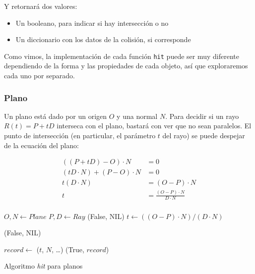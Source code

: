 Y retornará dos valores:

\begin{itemize}
    \item Un booleano, para indicar si hay intersección o no
    \item Un diccionario con los datos de la colisión, si corresponde
\end{itemize}

Como vimos, la implementación de cada función \texttt{hit} puede ser muy
diferente dependiendo de la forma y las propiedades de cada objeto, así que
exploraremos cada uno por separado.

\subsubsection{Plano}

Un plano está dado por un origen $O$ y una normal $N$. Para decidir si un rayo
$R(t) = P + tD$ interseca con el plano, bastará con ver que no sean paralelos.
El punto de intersección (en particular, el parámetro $t$ del rayo) se puede
despejar de la ecuación del plano:

\begin{align*}
    ((P + tD) - O) \cdot N &= 0 \\
    (tD \cdot N) + (P - O) \cdot N &= 0 \\
    t(D \cdot N) &= (O - P) \cdot N \\
    t &= \frac{(O - P) \cdot N}{D \cdot N} \\
\end{align*}

\begin{algorithm}
\begin{algorithmic}[1]
    \State $O, N \gets Plane$ 
    \State $P, D \gets Ray$ 
     
        \State \Return (False, NIL)
    \EndIf
    \State $t \gets ((O - P) \cdot N)/(D \cdot N)$

     
        \State \Return (False, NIL)
    \EndIf

    \State $record \gets$ ($t$, $N$, \dots) 
    \State \Return (True, $record$)
\EndFunction
\end{algorithmic}
\caption{Algoritmo \textit{hit} para planos}
\label{alg:plane-hit}
\end{algorithm}

